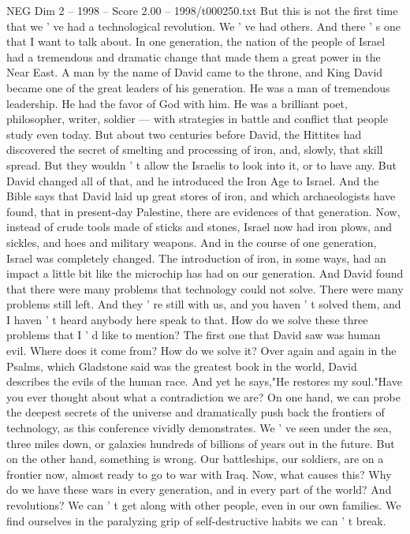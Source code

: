 \begin{textsample}{NEG Dim 2 – 1998 – Score 2.00 – 1998/t000250.txt}
But this is not the first time that we ' ve had a technological revolution.
We ' ve had others.
And there ' s one that I want to talk about.
In one generation, the nation of the people of Israel had a tremendous and dramatic change that made them a great power in the Near East.
A man by the name of David came to the throne, and King David became one of the great leaders of his generation.
He was a man of tremendous leadership.
He had the favor of God with him.
He was a brilliant poet, philosopher, writer, soldier — with strategies in battle and conflict that people study even today.
But about two centuries before David, the Hittites had discovered the secret of smelting and processing of iron, and, slowly, that skill spread.
But they wouldn ' t allow the Israelis to look into it, or to have any.
But David changed all of that, and he introduced the Iron Age to Israel.
And the Bible says that David laid up great stores of iron, and which archaeologists have found, that in present-day Palestine, there are evidences of that generation.
Now, instead of crude tools made of sticks and stones, Israel now had iron plows, and sickles, and hoes and military weapons.
And in the course of one generation, Israel was completely changed.
The introduction of iron, in some ways, had an impact a little bit like the microchip has had on our generation.
And David found that there were many problems that technology could not solve.
There were many problems still left.
And they ' re still with us, and you haven ' t solved them, and I haven ' t heard anybody here speak to that.
How do we solve these three problems that I ' d like to mention?
The first one that David saw was human evil.
Where does it come from?
How do we solve it?
Over again and again in the Psalms, which Gladstone said was the greatest book in the world, David describes the evils of the human race.
And yet he says,"He restores my soul."Have you ever thought about what a contradiction we are?
On one hand, we can probe the deepest secrets of the universe and dramatically push back the frontiers of technology, as this conference vividly demonstrates.
We ' ve seen under the sea, three miles down, or galaxies hundreds of billions of years out in the future.
But on the other hand, something is wrong.
Our battleships, our soldiers, are on a frontier now, almost ready to go to war with Iraq.
Now, what causes this?
Why do we have these wars in every generation, and in every part of the world?
And revolutions?
We can ' t get along with other people, even in our own families.
We find ourselves in the paralyzing grip of self-destructive habits we can ' t break.

\end{textsample}
